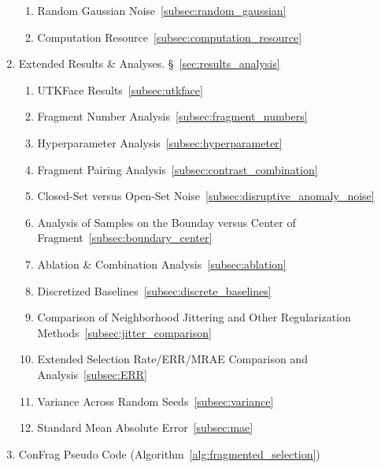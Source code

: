 \documentclass{article}
\theoremstyle{plain}
\theoremstyle{definition}
\theoremstyle{remark}
\begin{document}
\begin{enumerate}[label=\Roman*.]
\begin{enumerate}[label=\roman*.]
            \item Random Gaussian Noise~\ref{subsec:random_gaussian}
            \item Computation Resource~\ref{subsec:computation_resource}
        \end{enumerate}
    \item Extended Results \& Analyses. \S~\ref{sec:results_analysis}
        \begin{enumerate}[label=\roman*.]
            \item UTKFace Results~\ref{subsec:utkface}
            \item Fragment Number Analysis~\ref{subsec:fragment_numbers}
            \item Hyperparameter Analysis~\ref{subsec:hyperparameter}
            \item Fragment Pairing Analysis~\ref{subsec:contrast_combination}
            \item Closed-Set versus Open-Set Noise~\ref{subsec:disruptive_anomaly_noise}
            \item Analysis of Samples on the Bounday versus Center of Fragment~\ref{subsec:boundary_center}
            \item Ablation \& Combination Analysis~\ref{subsec:ablation}
            \item Discretized Baselines~\ref{subsec:discrete_baselines}
            \item Comparison of Neighborhood Jittering and Other Regularization Methods~\ref{subsec:jitter_comparison}
            \item Extended Selection Rate/ERR/MRAE Comparison and Analysis~\ref{subsec:ERR}
            \item Variance Across Random Seeds~\ref{subsec:variance}
            \item Standard Mean Absolute Error~\ref{subsec:mae}
        \end{enumerate}
    \item ConFrag Pseudo Code (Algorithm~\ref{alg:fragmented_selection})
\end{enumerate}
\end{document}
